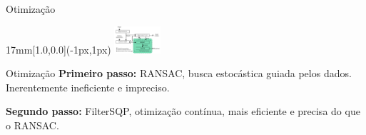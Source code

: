 \begin{frame}{Otimização}
  \begin{textblock*}{17mm}[1.0,0.0](\paperwidth-1px,1px)
    \includegraphics[width=17mm]{blocos_s4.png}
  \end{textblock*}
\end{frame}
\addtocounter{framenumber}{-1}

\begin{frame}{Otimização}{}
  {\bf Primeiro passo:} RANSAC, busca estocástica guiada pelos
  dados. Inerentemente ineficiente e impreciso.


  {\bf Segundo passo:} FilterSQP, otimização contínua, mais eficiente e
  precisa do que o RANSAC.
  

\end{frame}


